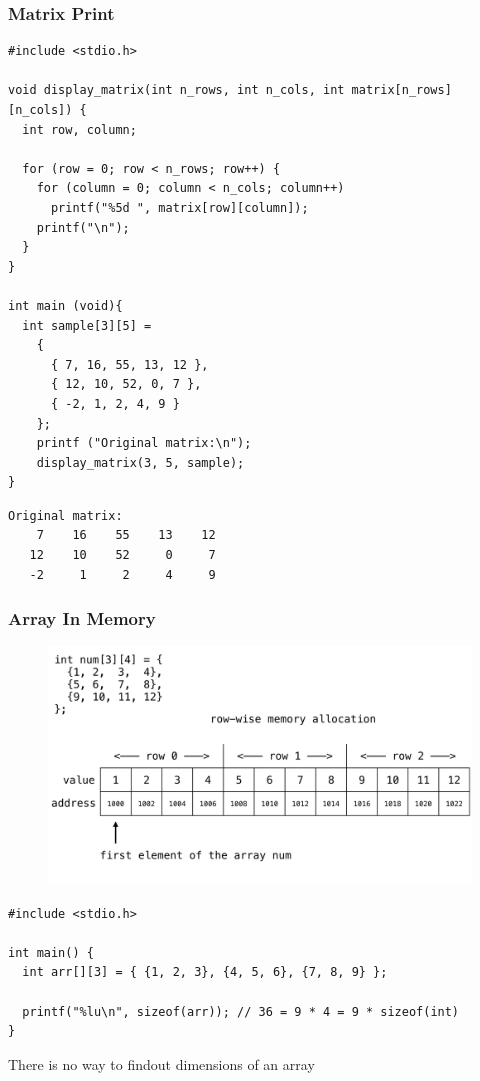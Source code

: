 \documentclass{../c-lecture}
\begin{document}
\begin{frame}[fragile]
  \frametitle{Matrix Print}
  \begin{verbatim}
#include <stdio.h>

void display_matrix(int n_rows, int n_cols, int matrix[n_rows][n_cols]) {
  int row, column;

  for (row = 0; row < n_rows; row++) {
    for (column = 0; column < n_cols; column++)
      printf("%5d ", matrix[row][column]);
    printf("\n");
  }
}

int main (void){
  int sample[3][5] =
    {
      { 7, 16, 55, 13, 12 },
      { 12, 10, 52, 0, 7 },
      { -2, 1, 2, 4, 9 }
    };
    printf ("Original matrix:\n");
    display_matrix(3, 5, sample);
}
  \end{verbatim}
\end{frame}

\begin{frame}[fragile]
  \begin{verbatim}
Original matrix:
    7    16    55    13    12
   12    10    52     0     7
   -2     1     2     4     9
  \end{verbatim}
\end{frame}

\begin{frame}
  \frametitle{Array In Memory}
  \begin{figure}
    \includegraphics[width=.75\textwidth]{./img/arrays-in-memory.png}
  \end{figure}
\end{frame}

\begin{frame}[fragile]
  \begin{verbatim}
#include <stdio.h>

int main() {
  int arr[][3] = { {1, 2, 3}, {4, 5, 6}, {7, 8, 9} };

  printf("%lu\n", sizeof(arr)); // 36 = 9 * 4 = 9 * sizeof(int)
}
  \end{verbatim}
  \begin{block}{}
    There is no way to findout dimensions of an array
  \end{block}
\end{frame}
\end{document}
